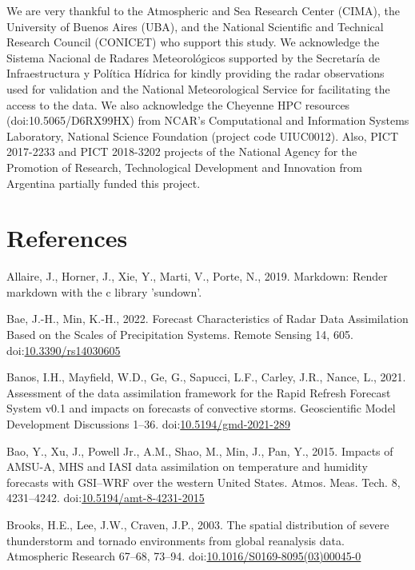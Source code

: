 \documentclass[final,5p,times,twocolumn,authoryear]{elsarticle} %
\begin{document}
We are very thankful to the Atmospheric and Sea Research Center (CIMA), the University of Buenos Aires (UBA), and the National Scientific and Technical Research Council (CONICET) who support this study. We acknowledge the Sistema Nacional de Radares Meteorológicos supported by the Secretaría de Infraestructura y Política Hídrica for kindly providing the radar observations used for validation and the National Meteorological Service for facilitating the access to the data. We also acknowledge the Cheyenne HPC resources (doi:10.5065/D6RX99HX) from NCAR's Computational and Information Systems Laboratory, National Science Foundation (project code UIUC0012). Also, PICT 2017-2233 and PICT 2018-3202 projects of the National Agency for the Promotion of Research, Technological Development and Innovation from Argentina partially funded this project.

\hypertarget{references}{%
\section*{References}\label{references}}

\hypertarget{refs}{}
\leavevmode\hypertarget{ref-allaire2019}{}%
Allaire, J., Horner, J., Xie, Y., Marti, V., Porte, N., 2019. Markdown: Render markdown with the c library 'sundown'.

\leavevmode\hypertarget{ref-bae2022}{}%
Bae, J.-H., Min, K.-H., 2022. Forecast Characteristics of Radar Data Assimilation Based on the Scales of Precipitation Systems. Remote Sensing 14, 605. doi:\href{https://doi.org/10.3390/rs14030605}{10.3390/rs14030605}

\leavevmode\hypertarget{ref-banos2021}{}%
Banos, I.H., Mayfield, W.D., Ge, G., Sapucci, L.F., Carley, J.R., Nance, L., 2021. Assessment of the data assimilation framework for the Rapid Refresh Forecast System v0.1 and impacts on forecasts of convective storms. Geoscientific Model Development Discussions 1--36. doi:\href{https://doi.org/10.5194/gmd-2021-289}{10.5194/gmd-2021-289}

\leavevmode\hypertarget{ref-bao2015}{}%
Bao, Y., Xu, J., Powell Jr., A.M., Shao, M., Min, J., Pan, Y., 2015. Impacts of AMSU-A, MHS and IASI data assimilation on temperature and humidity forecasts with GSI--WRF over the western United States. Atmos. Meas. Tech. 8, 4231--4242. doi:\href{https://doi.org/10.5194/amt-8-4231-2015}{10.5194/amt-8-4231-2015}

\leavevmode\hypertarget{ref-brooks2003}{}%
Brooks, H.E., Lee, J.W., Craven, J.P., 2003. The spatial distribution of severe thunderstorm and tornado environments from global reanalysis data. Atmospheric Research 67--68, 73--94. doi:\href{https://doi.org/10.1016/S0169-8095(03)00045-0}{10.1016/S0169-8095(03)00045-0}
\end{document}
